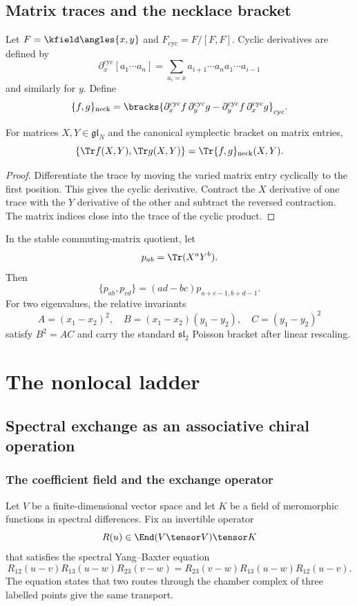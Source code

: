 \chapter{Matrix traces and the necklace bracket}
Let $F=\kfield\angles{x,y}$ and $F_{\mathrm{cyc}}=F/[F,F]$. Cyclic derivatives are defined by
\[
 \partial_x^{\mathrm{cyc}}[a_1\cdots a_n]
 =\sum_{a_i=x}a_{i+1}\cdots a_na_1\cdots a_{i-1}
\]
and similarly for $y$. Define
\[
 \{f,g\}_{\mathrm{neck}}
 =\bracks{
 \partial_x^{\mathrm{cyc}}f\,\partial_y^{\mathrm{cyc}}g
 -\partial_y^{\mathrm{cyc}}f\,\partial_x^{\mathrm{cyc}}g}_{\mathrm{cyc}}.
\]

\begin{theorem}
For matrices $X,Y\in\mathfrak{gl}_N$ and the canonical symplectic bracket on matrix entries,
\[
 \{\Tr f(X,Y),\Tr g(X,Y)\}
 =\Tr\{f,g\}_{\mathrm{neck}}(X,Y).
\]
\end{theorem}
\begin{proof}
Differentiate the trace by moving the varied matrix entry cyclically to the first position. This gives the cyclic derivative. Contract the $X$ derivative of one trace with the $Y$ derivative of the other and subtract the reversed contraction. The matrix indices close into the trace of the cyclic product.
\end{proof}

In the stable commuting-matrix quotient, let
\[
 p_{ab}=\Tr(X^aY^b).
\]
Then
\[
 \{p_{ab},p_{cd}\}=(ad-bc)p_{a+c-1,b+d-1}.
\]
For two eigenvalues, the relative invariants
\[
 A=(x_1-x_2)^2,
 \quad B=(x_1-x_2)(y_1-y_2),
 \quad C=(y_1-y_2)^2
\]
satisfy $B^2=AC$ and carry the standard $\mathfrak{sl}_2$ Poisson bracket after linear rescaling.


\part{The nonlocal ladder}

\chapter{Spectral exchange as an associative chiral operation}
\section{The coefficient field and the exchange operator}
Let $V$ be a finite-dimensional vector space and let $K$ be a field of meromorphic functions in spectral differences.  Fix an invertible operator
\[
 R(u)\in\End(V\tensor V)\tensor K
\]
that satisfies the spectral Yang--Baxter equation
\begin{equation}\label{eq:vol1-spectral-ybe}
 R_{12}(u-v)R_{13}(u-w)R_{23}(v-w)
 =R_{23}(v-w)R_{13}(u-w)R_{12}(u-v).
\end{equation}
The equation states that two routes through the chamber complex of three labelled points give the same transport.

